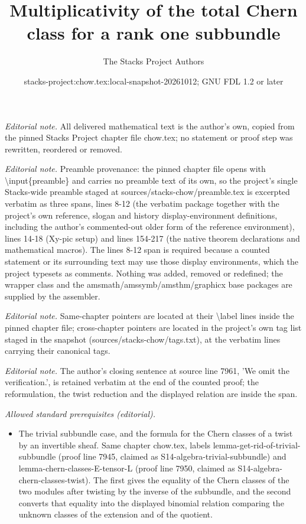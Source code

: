 \documentclass[10pt,a4paper]{amsart}
\title{Multiplicativity of the total Chern class for a rank one subbundle}
\author{The Stacks Project Authors}
\date{stacks-project:chow.tex:local-snapshot-20261012; GNU FDL 1.2 or later}
\theoremstyle{plain}
\theoremstyle{definition}
\theoremstyle{remark}
\numberwithin{equation}{subsection}
\begin{document}
\maketitle
\noindent\textit{Editorial note.} All delivered mathematical text is the author's own, copied from the pinned Stacks Project chapter file chow.tex; no statement or proof step was rewritten, reordered or removed.\par\medskip
\noindent\textit{Editorial note.} Preamble provenance: the pinned chapter file opens with \textbackslash{}input\{preamble\} and carries no preamble text of its own, so the project's single Stacks-wide preamble staged at sources/stacks-chow/preamble.tex is excerpted verbatim as three spans, lines 8-12 (the verbatim package together with the project's own reference, slogan and history display-environment definitions, including the author's commented-out older form of the reference environment), lines 14-18 (Xy-pic setup) and lines 154-217 (the native theorem declarations and mathematical macros). The lines 8-12 span is required because a counted statement or its surrounding text may use those display environments, which the project typesets as comments. Nothing was added, removed or redefined; the wrapper class and the amsmath/amssymb/amsthm/graphicx base packages are supplied by the assembler.\par\medskip
\noindent\textit{Editorial note.} Same-chapter pointers are located at their \textbackslash{}label lines inside the pinned chapter file; cross-chapter pointers are located in the project's own tag list staged in the snapshot (sources/stacks-chow/tags.txt), at the verbatim lines carrying their canonical tags.\par\medskip
\noindent\textit{Editorial note.} The author's closing sentence at source line 7961, 'We omit the verification.', is retained verbatim at the end of the counted proof; the reformulation, the twist reduction and the displayed relation are inside the span.\par\medskip
\noindent\textit{Allowed standard prerequisites (editorial).}\begin{itemize}
\item The trivial subbundle case, and the formula for the Chern classes of a twist by an invertible sheaf. Same chapter chow.tex, labels lemma-get-rid-of-trivial-subbundle (proof line 7945, claimed as S14-algebra-trivial-subbundle) and lemma-chern-classes-E-tensor-L (proof line 7950, claimed as S14-algebra-chern-classes-twist). The first gives the equality of the Chern classes of the two modules after twisting by the inverse of the subbundle, and the second converts that equality into the displayed binomial relation comparing the unknown classes of the extension and of the quotient.
\end{itemize}\medskip
\end{document}
